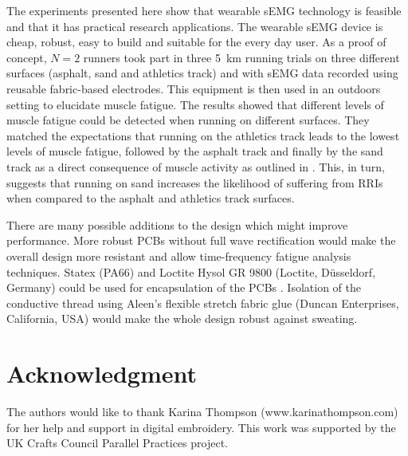 \documentclass[letterpaper, 10 pt, conference]{ieeeconf}
\begin{document}
The experiments presented here show that wearable sEMG technology is feasible
and that it has practical research applications. The wearable sEMG device is cheap, robust,
easy to build and suitable for the every day user. As a proof of concept, $N=2$
runners took part in three \SI{5}{\kilo\meter} running trials on three
different surfaces (asphalt, sand and athletics track) and with sEMG data recorded using reusable fabric-based electrodes. This equipment is then used in an outdoors setting to elucidate muscle fatigue. The results showed that
different levels of muscle fatigue could be detected when running on different
surfaces. They matched the expectations that running on the athletics track
leads to the lowest levels of muscle fatigue, followed by the asphalt track and
finally by the sand track as a direct consequence of muscle activity as outlined in \cite{pinnington2005kinematic}. This, in turn, suggests that running on sand
increases the likelihood of suffering from RRIs when compared to the asphalt
and athletics track surfaces.

There are many possible additions to the design
which might improve performance. More robust PCBs without full wave
rectification would make the overall design more resistant and allow time-frequency
fatigue analysis techniques. Statex (PA66) and Loctite Hysol GR 9800 (Loctite,
Düsseldorf, Germany) could be used for encapsulation of the PCBs
\cite{linz2005embroidering}. Isolation of the conductive thread using Aleen's
flexible stretch fabric glue (Duncan Enterprises, California, USA) would make
the whole design robust against sweating.








\section*{Acknowledgment}
The authors would like to thank Karina Thompson (www.karinathompson.com) for
her help and support in digital embroidery. This work was supported by the UK
Crafts Council Parallel Practices project.





\end{document}
